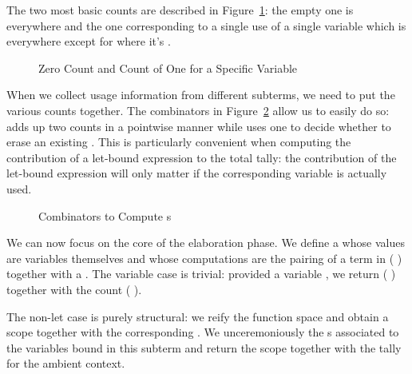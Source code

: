 The two most basic counts are described in Figure~\ref{fig:basiccount}: the
empty one is  everywhere and the one corresponding to a single use
of a single variable  which is  everywhere except for 
where it's .

\begin{figure}[H]
\begin{minipage}{0.45\textwidth}
\end{minipage}
\begin{minipage}{0.45\textwidth}
\end{minipage}
\caption{Zero Count and Count of One for a Specific Variable}\label{fig:basiccount}
\end{figure}

When we collect usage information from different subterms, we need to put the
various counts together. The combinators in Figure~\ref{fig:combinatorscount}
allow us to easily do so:  adds up two counts in a pointwise manner
while  uses one  to decide whether to erase an existing
. This is particularly convenient when computing the contribution of
a let-bound expression to the total tally: the contribution of the let-bound
expression will only matter if the corresponding variable is actually used.

\begin{figure}[H]
\begin{minipage}{0.5\textwidth}
\end{minipage}
\begin{minipage}{0.4\textwidth}
\end{minipage}
\caption{Combinators to Compute s}\label{fig:combinatorscount}
\end{figure}

We can now focus on the core of the elaboration phase. We define a
 whose values are variables themselves and whose computations
are the pairing of a term in {(  )} together with
a . The variable case is trivial: provided a variable ,
we return {( )} together with the count {( )}.

The non-let case is purely structural: we reify the  function
space and obtain a scope together with the corresponding . We
unceremoniously  the s associated to the variables
bound in this subterm and return the scope together with the tally for
the ambient context.

